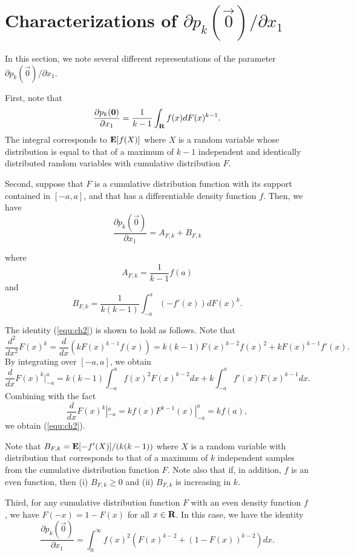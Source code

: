 \section{Characterizations of $\partial p_k(\vec{0})/\partial x_1$}

In this section, we note several different representations of the parameter $\partial p_k(\vec{0})/\partial x_1$. 

First, note that
\begin{equation}
\frac{\partial p_k(\mathbf{0})}{\partial x_1} = \frac{1}{k-1}\int_{\mathbf{R}} f(x)dF(x)^{k-1}.
\label{equ:ch1}
\end{equation} 
The integral corresponds to $\mathbf{E}[f(X)]$ where $X$ is a random variable whose distribution is equal to that of a maximum of $k-1$ independent and identically distributed random variables with cumulative distribution $F$. 

Second, suppose that $F$ is a cumulative distribution function with its support contained in $[-a,a]$, and that has a differentiable density function $f$. Then, we have
\begin{equation}
\frac{\partial p_k(\vec{0})}{\partial x_1} = A_{F,k} + B_{F,k}
\label{equ:ch2}
\end{equation}

where
$$
A_{F,k} = \frac{1}{k-1}f(a)
$$
and
$$
B_{F,k} = \frac{1}{k(k-1)}\int_{-a}^{a} (-f'(x))dF(x)^k.
$$

The identity (\ref{equ:ch2}) is shown to hold as follows. Note that
$$
\frac{d^2}{dx^2} F(x)^k = \frac{d}{dx}(k F(x)^{k-1}f(x))
= k(k-1)F(x)^{k-2}f(x)^2 + kF(x)^{k-1}f'(x).
$$
By integrating over $[-a,a]$, we obtain
$$
\frac{d}{dx}F(x)^k |_{-a}^{a} = k(k-1) \int_{-a}^{a} f(x)^2 F(x)^{k-2}dx + k \int_{-a}^{a} f'(x) F(x)^{k-1}dx. 
$$
Combining with the fact 
$$
\frac{d}{dx}F(x)^k |_{-a}^{a} = k f(x)F^{k-1}(x) |_{-a}^{a} = k f(a), 
$$
we obtain (\ref{equ:ch2}). 

Note that $B_{F,k} = \mathbf{E}[-f'(X)]/(k(k-1))$ where $X$ is a random variable with distribution that corresponds to that of a maximum of $k$ independent samples from the cumulative distribution function $F$. Note also that if, in addition, $f$ is an even function, then (i) $B_{F,k} \geq 0$ and (ii) $B_{F,k}$ is increasing in $k$.

Third, for any cumulative distribution function $F$ with an even density function $f$, we have $F(-x) = 1-F(x)$ for all $x\in \mathbf{R}$. In this case, we have the identity
\begin{equation}
\frac{\partial p_k(\vec{0})}{\partial x_1} = \int_0^\infty f(x)^2 (F(x)^{k-2} + (1-F(x))^{k-2}) dx.
\label{equ:gammafeven}
\end{equation}

